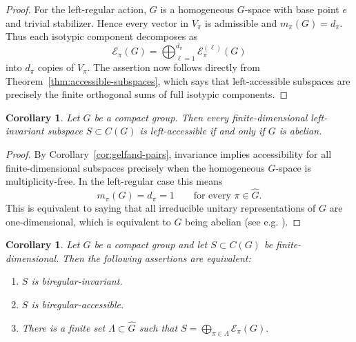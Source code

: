 \documentclass[11pt,showkeys]{amsart}
\newtheorem{corollary}[theorem]{Corollary}
\begin{document}
\begin{proof}
For the left-regular action, \(G\) is a homogeneous \(G\)-space with base
point \(e\) and trivial stabilizer. Hence every vector in \(V_\pi\) is
admissible and
\(
        m_\pi(G)=d_\pi .
\)
Thus each isotypic component decomposes as
\[
        \mathcal E_\pi(G)
        =
        \bigoplus_{\ell=1}^{d_\pi}
        \mathcal E_\pi^{(\ell)}(G)
\]
into \(d_\pi\) copies of \(V_\pi\). The assertion now follows directly
from Theorem~\ref{thm:accessible-subspaces}, which says that left-accessible
subspaces are precisely the finite orthogonal sums of full isotypic
components.
\end{proof}

\begin{corollary}
\label{cor:left-invariance-accessibility-abelian}
Let \(G\) be a compact group. Then every finite-dimensional
left-invariant subspace \(S\subset C(G)\) is left-accessible if and only
if \(G\) is abelian.
\end{corollary}

\begin{proof}
By Corollary~\ref{cor:gelfand-pairs}, invariance implies accessibility
for all finite-dimensional subspaces precisely when the homogeneous
\(G\)-space is multiplicity-free. In the left-regular case this means
\[
        m_\pi(G)=d_\pi=1
        \qquad
        \text{for every }\pi\in\widehat G .
\]
This is equivalent to saying that all irreducible unitary
representations of \(G\) are one-dimensional, which is equivalent to
\(G\) being abelian (see e.g. \cite{folland2016course}).
\end{proof}

\begin{corollary}
\label{cor:biregular-invariance-accessibility}
Let \(G\) be a compact group and let \(S\subset C(G)\) be
finite-dimensional. Then the following assertions are equivalent:
\begin{enumerate}
\item \(S\) is biregular-invariant.
\item \(S\) is biregular-accessible.
\item There is a finite set \(\Lambda\subset\widehat G\) such that
      \(
              S
              =
              \bigoplus_{\pi\in\Lambda}
              \mathcal E_\pi(G).
      \)
\end{enumerate}
\end{corollary}
\end{document}
